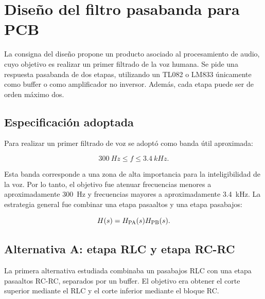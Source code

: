\section{Diseño del filtro pasabanda para PCB}

La consigna del diseño propone un producto asociado al procesamiento de audio, cuyo objetivo es realizar un primer filtrado de la voz humana. Se pide una respuesta pasabanda de dos etapas, utilizando un TL082 o LM833 únicamente como buffer o como amplificador no inversor. Además, cada etapa puede ser de orden máximo dos.

\subsection{Especificación adoptada}

Para realizar un primer filtrado de voz se adoptó como banda útil aproximada:

\begin{equation}
    \boxed{\SI{300}{Hz}\leq f \leq \SI{3.4}{kHz}}.
\end{equation}

Esta banda corresponde a una zona de alta importancia para la inteligibilidad de la voz. Por lo tanto, el objetivo fue atenuar frecuencias menores a aproximadamente \SI{300}{Hz} y frecuencias mayores a aproximadamente \SI{3.4}{kHz}. La estrategia general fue combinar una etapa pasaaltos y una etapa pasabajos:

\begin{equation}
    H(s)=H_{\mathrm{PA}}(s)H_{\mathrm{PB}}(s).
\end{equation}

\subsection{Alternativa A: etapa RLC y etapa RC-RC}

La primera alternativa estudiada combinaba un pasabajos RLC con una etapa pasaaltos RC-RC, separados por un buffer. El objetivo era obtener el corte superior mediante el RLC y el corte inferior mediante el bloque RC.

